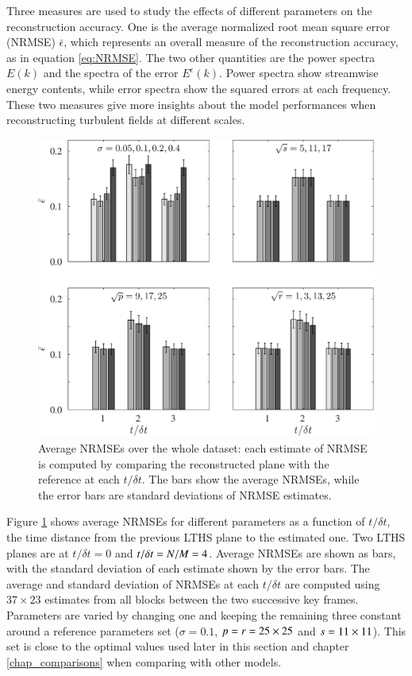 Three measures are used to study the effects of different parameters on the reconstruction accuracy. One is the average normalized root mean square error (NRMSE) $ \bar{\epsilon} $, which represents an overall measure of the reconstruction accuracy, as in equation \ref{eq:NRMSE}. The two other quantities are the power spectra $ E(k) $ and the spectra of the error $ E^{\epsilon}(k) $. Power spectra show streamwise energy contents, while error spectra show the squared errors at each frequency. These two measures give more insights about the model performances when reconstructing turbulent fields at different scales. 

\begin{figure}[t]
	\centering
	\includegraphics[width=\columnwidth]{./images/NLM/interpdiff/NLmean_propag1dir_spacing3_tspacing4_allparams_NRMSE.eps}
	\caption{\label{fig:NLM_various_params_NRMSE} Average NRMSEs over the whole dataset: each estimate of NRMSE is computed by comparing the reconstructed plane with the reference at each $ t/\delta t $. The bars show the average NRMSEs, while the error bars are standard deviations of NRMSE estimates.}
\end{figure}

Figure \ref{fig:NLM_various_params_NRMSE} shows average NRMSEs for different parameters as a function of $ t/\delta t $, the time distance from the previous LTHS plane to the estimated one. Two LTHS planes are at $ t/\delta t = 0 $ and $ t/\delta t = N/M = 4 $. Average NRMSEs are shown as bars, with the standard deviation of each estimate shown by the error bars. The average and standard deviation of NRMSEs at each $ t/\delta t $ are computed using $ 37 \times 23 $ estimates from all blocks between the two successive key frames. Parameters are varied by changing one and keeping the remaining three constant around a reference parameters set ($ \sigma=0.1 $, $ p=r=25 \times 25 $ and $ s = 11 \times 11$). This set is close to the optimal values used later in this section and chapter \ref{chap_comparisons} when comparing with other models.

